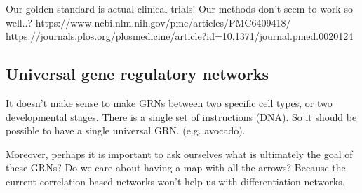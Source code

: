 Our golden standard is actual clinical trials! Our methods don't seem to work so well..?
https://www.ncbi.nlm.nih.gov/pmc/articles/PMC6409418/
https://journals.plos.org/plosmedicine/article?id=10.1371/journal.pmed.0020124


\subsection{Universal gene regulatory networks}

It doesn't make sense to make GRNs between two specific cell types, or two developmental stages. There is a single set of instructions (DNA). So it should be possible to have a single universal GRN. (e.g. avocado).

Moreover, perhaps it is important to ask ourselves what is ultimately the goal of these GRNs? Do we care about having a map with all the arrows? Because the current correlation-based networks won't help us with differentiation networks. 